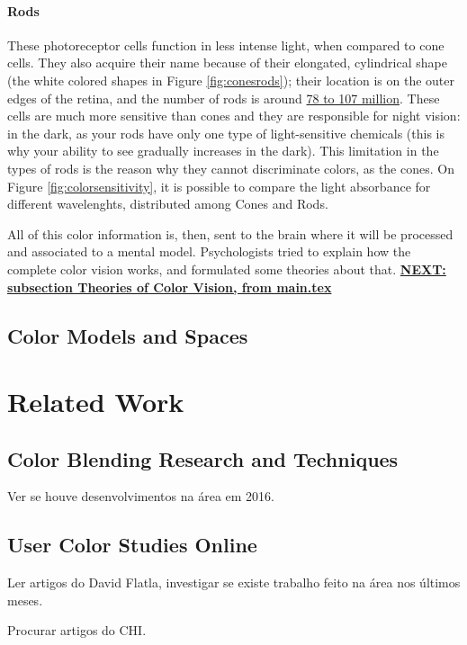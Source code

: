 \paragraph{Rods}
%
These photoreceptor cells function in less intense light, when compared to cone cells. They also acquire
their name because of their elongated, cylindrical shape (the white colored shapes in Figure \ref{fig:conesrods});
their location is on the outer edges of the retina, and the number of rods is around \underline{78 to 107 million}. These
cells are much more sensitive than
cones and they are responsible for night vision: in the dark, as your rods have only one type of light-sensitive chemicals (this is why your ability to see gradually increases in the dark). This limitation in the types of rods is the
reason why they cannot discriminate colors, as the cones. On Figure \ref{fig:colorsensitivity}, it is possible to compare
the light absorbance for different wavelenghts, distributed among Cones and Rods. \\ \par
%
All of this color information is, then, sent to the brain where it will be processed and associated to a
mental model. Psychologists tried to explain how the complete color vision works, and formulated some
theories about that.
%
\textbf{\ul{NEXT: subsection Theories of Color Vision, from main.tex}}
%
\subsection{Color Models and Spaces}
\label{subsec:colormodelspaces}

\section{Related Work}
\label{sec:related_work}

\subsection{Color Blending Research and Techniques}
\label{subsec:colorblending}
%
Ver se houve desenvolvimentos na área em 2016. \par
%
\subsection{User Color Studies Online}
\label{subsec:colorstudies}
%
Ler artigos do David Flatla, investigar se existe trabalho feito na área nos últimos meses. \par
Procurar artigos do CHI. \par
%
